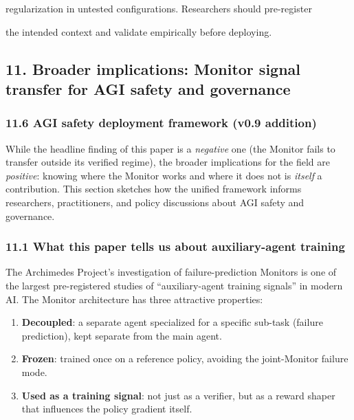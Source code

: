 \documentclass[
]{article}
\providecommand{\tightlist}{%
  \setlength{\itemsep}{0pt}\setlength{\parskip}{0pt}}
\begin{document}
regularization in untested configurations. Researchers should
pre-register

the intended context and validate empirically before deploying.

\subsection{11. Broader implications: Monitor signal transfer for AGI
safety and
governance}\label{broader-implications-monitor-signal-transfer-for-agi-safety-and-governance}

\subsubsection{11.6 AGI safety deployment framework (v0.9
addition)}\label{agi-safety-deployment-framework-v0.9-addition}

While the headline finding of this paper is a \emph{negative} one (the
Monitor fails to transfer outside its verified regime), the broader
implications for the field are \emph{positive}: knowing where the
Monitor works and where it does not is \emph{itself} a contribution.
This section sketches how the unified framework informs researchers,
practitioners, and policy discussions about AGI safety and governance.

\subsubsection{11.1 What this paper tells us about auxiliary-agent
training}\label{what-this-paper-tells-us-about-auxiliary-agent-training}

The Archimedes Project's investigation of failure-prediction Monitors is
one of the largest pre-registered studies of ``auxiliary-agent training
signals'' in modern AI. The Monitor architecture has three attractive
properties:

\begin{enumerate}
\def\labelenumi{\arabic{enumi}.}
\tightlist
\item
  \textbf{Decoupled}: a separate agent specialized for a specific
  sub-task (failure prediction), kept separate from the main agent.
\item
  \textbf{Frozen}: trained once on a reference policy, avoiding the
  joint-Monitor failure mode.
\item
  \textbf{Used as a training signal}: not just as a verifier, but as a
  reward shaper that influences the policy gradient itself.
\end{enumerate}
\end{document}
